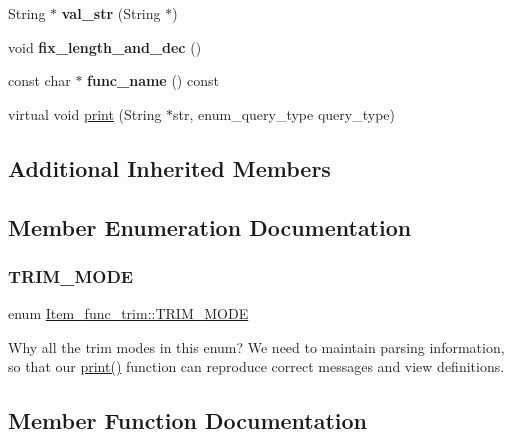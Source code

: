\begin{DoxyCompactItemize}
String $\ast$ {\bfseries val\+\_\+str} (String $\ast$)
\item 
\mbox{\label{classItem__func__trim_a9e06781e484a5b6749db6e8b8f0bcb21}} 
void {\bfseries fix\+\_\+length\+\_\+and\+\_\+dec} ()
\item 
\mbox{\label{classItem__func__trim_a1eaae20ea770ea0f3a38ed183ce9daab}} 
const char $\ast$ {\bfseries func\+\_\+name} () const
\item 
virtual void \mbox{\hyperlink{classItem__func__trim_a1a6186bb6a876ebfa09ee9c600c0bdfd}{print}} (String $\ast$str, enum\+\_\+query\+\_\+type query\+\_\+type)
\end{DoxyCompactItemize}
\subsection*{Additional Inherited Members}


\subsection{Member Enumeration Documentation}
\mbox{\label{classItem__func__trim_a69d666d541f868b8499aaad03911cbf1}} 
\subsubsection{\texorpdfstring{T\+R\+I\+M\+\_\+\+M\+O\+DE}{TRIM\_MODE}}
{\footnotesize\ttfamily enum \mbox{\hyperlink{classItem__func__trim_a69d666d541f868b8499aaad03911cbf1}{Item\+\_\+func\+\_\+trim\+::\+T\+R\+I\+M\+\_\+\+M\+O\+DE}}}

Why all the trim modes in this enum? We need to maintain parsing information, so that our \mbox{\hyperlink{classItem__func__trim_a1a6186bb6a876ebfa09ee9c600c0bdfd}{print()}} function can reproduce correct messages and view definitions. 

\subsection{Member Function Documentation}
\mbox{\label{classItem__func__trim_a1a6186bb6a876ebfa09ee9c600c0bdfd}} 
